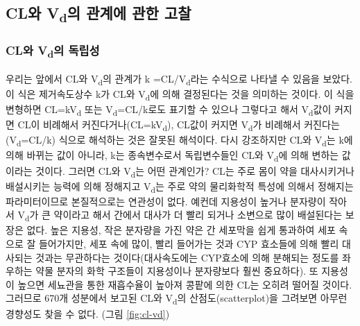 \documentclass[
  11pt,
  krantz2, a4paper, twoside]{krantz}
\theoremstyle{definition}
\theoremstyle{definition}
\theoremstyle{definition}
\theoremstyle{definition}
\theoremstyle{remark}
\begin{document}
\subsection{\texorpdfstring{CL와 V\textsubscript{d}의 관계에 관한 고찰}{CL와 Vd의 관계에 관한 고찰}}\label{cluxc640-vduxc758-uxad00uxacc4uxc5d0-uxad00uxd55c-uxace0uxcc30}

\subsubsection{\texorpdfstring{CL와 V\textsubscript{d}의 독립성}{CL와 Vd의 독립성}}\label{cluxc640-vduxc758-uxb3c5uxb9bduxc131}

우리는 앞에서 CL와 V\textsubscript{d}의 관계가 k =CL/V\textsubscript{d}라는 수식으로 나타낼 수
있음을 보았다. 이 식은 제거속도상수 k가 CL와 V\textsubscript{d}에 의해 결정된다는 것을
의미하는 것이다. 이 식을 변형하면 CL=kV\textsubscript{d} 또는 V\textsubscript{d}=CL/k로도 표기할 수
있으나 그렇다고 해서 V\textsubscript{d}값이 커지면 CL이 비례해서 커진다거나(CL=kV\textsubscript{d}),
CL값이 커지면 V\textsubscript{d}가 비례해서 커진다는(V\textsubscript{d}=CL/k) 식으로 해석하는 것은
잘못된 해석이다. 다시 강조하지만 CL와 V\textsubscript{d}는 k에 의해 바뀌는 값이
아니라, k는 종속변수로서 독립변수들인 CL와 V\textsubscript{d}에 의해 변하는 값이라는 것이다.
그러면 CL와 V\textsubscript{d}는 어떤 관계인가? CL는 주로 몸이 약을 대사시키거나
배설시키는 능력에 의해 정해지고 V\textsubscript{d}는 주로 약의 물리화학적 특성에
의해서 정해지는 파라미터이므로 본질적으로는 연관성이 없다. 예컨데
지용성이 높거나 분자량이 작아서 V\textsubscript{d}가 큰 약이라고 해서 간에서 대사가 더
빨리 되거나 소변으로 많이 배설된다는 보장은 없다. 높은 지용성, 작은
분자량을 가진 약은 간 세포막을 쉽게 통과하여 세포 속으로 잘 들어가지만,
세포 속에 많이, 빨리 들어가는 것과 CYP 효소들에 의해 빨리 대사되는
것과는 무관하다는 것이다(대사속도에는 CYP효소에 의해 분해되는 정도를 좌우하는 약물 분자의
화학 구조들이 지용성이나 분자량보다 훨씬 중요하다). 또 지용성이 높으면
세뇨관을 통한 재흡수율이 높아져 콩팥에 의한 CL는 오히려 떨어질 것이다.
그러므로 670개 성분에서 보고된 CL와 V\textsubscript{d}의 산점도(scatterplot)을
그려보면 아무런 경향성도 찾을 수 없다. (그림 \ref{fig:cl-vd})
\end{document}
